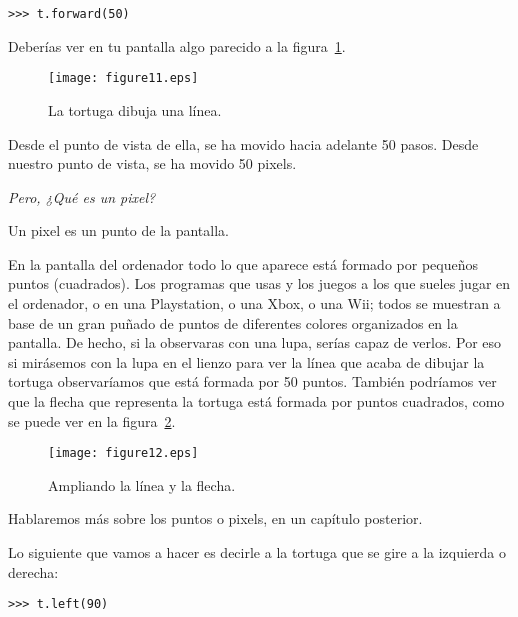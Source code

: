 \begin{listing}
\begin{verbatim}
>>> t.forward(50)
\end{verbatim}
\end{listing}

Deberías ver en tu pantalla algo parecido a la figura~\ref{fig11}.

\begin{figure}
\begin{center}
\texttt{[image: figure11.eps]}
\end{center}
\caption{La tortuga dibuja una línea.}\label{fig11}
\end{figure}

Desde el punto de vista de ella, se ha movido hacia adelante 50 pasos.  Desde nuestro punto de vista, se ha movido 50 pixels.

\noindent
\emph{Pero, ¿Qué es un pixel?}

Un pixel es un punto de la pantalla.

En la pantalla del ordenador todo lo que aparece está formado por pequeños puntos (cuadrados).  Los programas que usas y los juegos a los que sueles jugar en el ordenador, o en una Playstation, o una Xbox, o una Wii; todos se muestran a base de un gran puñado de puntos de diferentes colores organizados en la pantalla.  De hecho, si la observaras con una lupa, serías capaz de verlos. Por eso si mirásemos con la lupa en el lienzo para ver la línea que acaba de dibujar la tortuga observaríamos que está formada por 50 puntos. También podríamos ver que la flecha que representa la tortuga está formada por puntos cuadrados, como se puede ver en la figura~\ref{fig12}.

\begin{figure}
\begin{center}
\texttt{[image: figure12.eps]}
\end{center}
\caption{Ampliando la línea y la flecha.}\label{fig12}
\end{figure}

Hablaremos más sobre los puntos o pixels, en un capítulo posterior.

Lo siguiente que vamos a hacer es decirle a la tortuga que se gire a la izquierda  o derecha:

\begin{listing}
\begin{verbatim}
>>> t.left(90)
\end{verbatim}
\end{listing}


